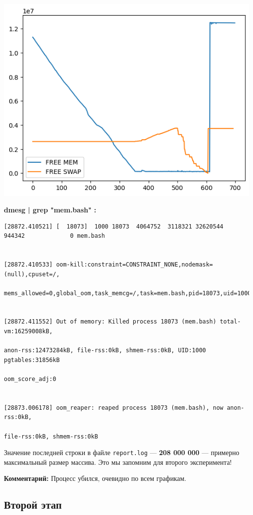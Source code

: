 \documentclass[10pt, a4paper]{article}
\begin{document}
\begin{itemize}
    \includegraphics[scale=0.8]{graphs/3.png}
\end{itemize}

\textbf{dmesg | grep "mem.bash" : }
\begin{lstlisting}
[28872.410521] [  18073]  1000 18073  4064752  3118321 32620544   944342             0 mem.bash


[28872.410533] oom-kill:constraint=CONSTRAINT_NONE,nodemask=(null),cpuset=/,

mems_allowed=0,global_oom,task_memcg=/,task=mem.bash,pid=18073,uid=1000


[28872.411552] Out of memory: Killed process 18073 (mem.bash) total-vm:16259008kB, 

anon-rss:12473284kB, file-rss:0kB, shmem-rss:0kB, UID:1000 pgtables:31856kB 

oom_score_adj:0


[28873.006178] oom_reaper: reaped process 18073 (mem.bash), now anon-rss:0kB, 

file-rss:0kB, shmem-rss:0kB
\end{lstlisting}

Значение последней строки в файле \texttt{report.log} --- \textbf{208 000 000} --- примерно максимальный размер массива. Это мы запомним для второго эксперимента!

\textbf{Комментарий:}
Процесс убился, очевидно по всем графикам.

\subsection*{Второй этап}
\end{document}
